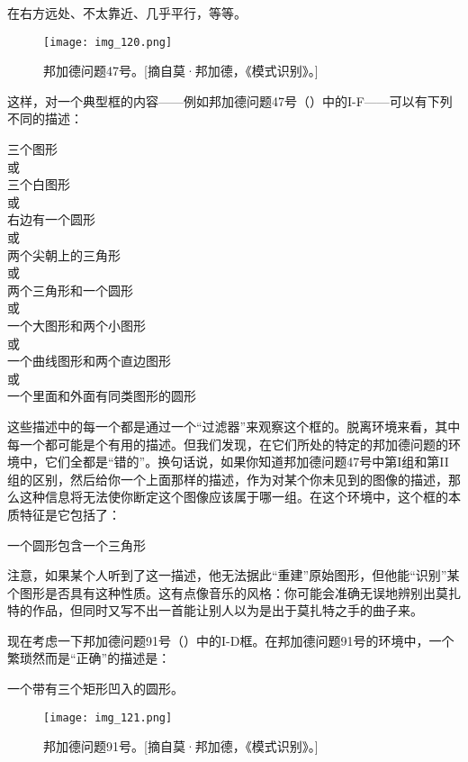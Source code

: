 \begin{block}
在右方远处、不太靠近、几乎平行，等等。
\end{block}

\begin{figure}
\texttt{[image: img\_120.png]}
\caption[邦加德问题47号。]
  {邦加德问题47号。[摘自莫·邦加德，《模式识别》。]}
\end{figure}

这样，对一个典型框的内容——例如邦加德问题47号（）中的I-F——可以有下列不同的描述：
\begin{center}
三个图形\\
或\\
三个白图形\\
或\\
右边有一个圆形\\
或\\
两个尖朝上的三角形\\
或\\
两个三角形和一个圆形\\
或\\
一个大图形和两个小图形\\
或\\
一个曲线图形和两个直边图形\\
或\\
一个里面和外面有同类图形的圆形
\end{center}

这些描述中的每一个都是通过一个“过滤器”来观察这个框的。脱离环境来看，其中每一个都可能是个有用的描述。但我们发现，在它们所处的特定的邦加德问题的环境中，它们全都是“错的”。换句话说，如果你知道邦加德问题47号中第I组和第II组的区别，然后给你一个上面那样的描述，作为对某个你未见到的图像的描述，那么这种信息将无法使你断定这个图像应该属于哪一组。在这个环境中，这个框的本质特征是它包括了：
\begin{block}
一个圆形包含一个三角形
\end{block}

注意，如果某个人听到了这一描述，他无法据此“重建”原始图形，但他能“识别”某个图形是否具有这种性质。这有点像音乐的风格：你可能会准确无误地辨别出莫扎特的作品，但同时又写不出一首能让别人以为是出于莫扎特之手的曲子来。

现在考虑一下邦加德问题91号（）中的I-D框。在邦加德问题91号的环境中，一个繁琐然而是“正确”的描述是：
\begin{center}
一个带有三个矩形凹入的圆形。
\end{center}

\begin{figure}
\texttt{[image: img\_121.png]}
\caption[邦加德问题91号。]
  {邦加德问题91号。[摘自莫·邦加德，《模式识别》。]}
\end{figure}

